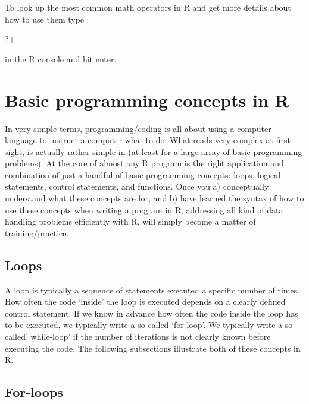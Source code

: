 \documentclass[
  12pt,
]{style/krantz}
\newenvironment{Shaded}{\begin{snugshade}}{\end{snugshade}}
\newcommand{\AttributeTok}[1]{\textcolor[rgb]{0.77,0.63,0.00}{#1}}
\newcommand{\NormalTok}[1]{#1}
\newcommand{\StringTok}[1]{\textcolor[rgb]{0.31,0.60,0.02}{#1}}
\begin{document}
To look up the most common math operators in R and get more details about how to use them type

\begin{Shaded}
\begin{Highlighting}[]
\NormalTok{?}\StringTok{\textasciigrave{}}\AttributeTok{+}\StringTok{\textasciigrave{}}
\end{Highlighting}
\end{Shaded}

in the R console and hit enter.

\hypertarget{basic-programming-concepts-in-r}{%
\section{Basic programming concepts in R}\label{basic-programming-concepts-in-r}}

In very simple terms, programming/coding is all about using a computer language to instruct a computer what to do. What reads very complex at first sight, is actually rather simple in (at least for a large array of basic programming problems). At the core of almost any R program is the right application and combination of just a handful of basic programming concepts: loops, logical statements, control statements, and functions. Once you a) conceptually understand what these concepts are for, and b) have learned the syntax of how to use these concepts when writing a program in R, addressing all kind of data handling problems efficiently with R, will simply become a matter of training/practice.

\hypertarget{loops}{%
\subsection{Loops}\label{loops}}

A loop is typically a sequence of statements executed a specific number of times. How often the code `inside' the loop is executed depends on a clearly defined control statement. If we know in advance how often the code inside the loop has to be executed, we typically write a so-called `for-loop'. We typically write a so-called' while-loop' if the number of iterations is not clearly known before executing the code. The following subsections illustrate both of these concepts in R.

\hypertarget{for-loops}{%
\subsection{For-loops}\label{for-loops}}
\end{document}
